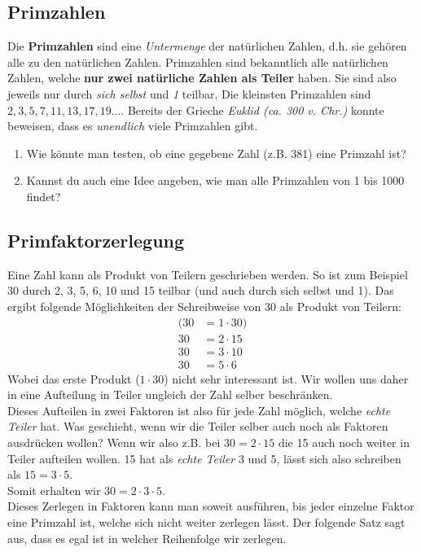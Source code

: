 \subsection{Primzahlen}
Die \textbf{Primzahlen} sind eine \textit{Untermenge} der natürlichen Zahlen, d.h. sie gehören alle zu den natürlichen Zahlen.
Primzahlen sind bekanntlich alle natürlichen Zahlen, welche \textbf{nur zwei natürliche Zahlen als Teiler} haben. Sie sind also jeweils nur durch \textit{sich selbst }und \textit{1} teilbar. Die kleinsten Primzahlen sind $2, 3, 5, 7, 11, 13, 17, 19...$. 
 Bereits der Grieche \emph{Euklid (ca. 300 v. Chr.)} konnte beweisen, dass es \emph{unendlich} viele Primzahlen gibt.
\begin{aufgabe}[Primzahltest]
\begin{center}
\begin{enumerate}[label=\alph*)]
\item Wie könnte man testen, ob eine gegebene Zahl (z.B. 381) eine Primzahl ist?
\item Kannst du auch eine Idee angeben, wie man alle Primzahlen von 1 bis 1000 findet?
\end{enumerate}
\end{center}
\end{aufgabe}
\subsection{Primfaktorzerlegung}
Eine Zahl kann als Produkt von Teilern geschrieben werden. 
So ist zum Beispiel 30 durch 2, 3, 5, 6, 10 und 15 teilbar (und auch durch sich selbst und 1). Das ergibt folgende Möglichkeiten der Schreibweise von 30 als Produkt von Teilern:
\begin{align*}
(30&=1\cdot 30)\\
30&=2\cdot 15\\
30&=3\cdot 10\\
30&=5\cdot 6
\end{align*}
Wobei das erste Produkt ($1\cdot 30$) nicht sehr interessant ist. Wir wollen uns daher in eine Aufteilung in Teiler ungleich der Zahl selber beschränken.\\
Dieses Aufteilen in zwei Faktoren ist also für jede Zahl möglich, welche \emph{echte Teiler} hat.
Was geschieht, wenn wir die Teiler selber auch noch als Faktoren ausdrücken wollen?
Wenn wir also z.B. bei $30=2\cdot 15$ die 15 auch noch weiter in Teiler aufteilen wollen. 15 hat als \emph{echte Teiler} 3 und 5, lässt sich also schreiben als $15=3\cdot 5$.\\
Somit erhalten wir $30=2\cdot 3\cdot 5$.\\
Dieses Zerlegen in Faktoren kann man soweit ausführen, bis jeder einzelne Faktor eine Primzahl ist, welche sich nicht weiter zerlegen lässt. Der folgende Satz sagt aus, dass es egal ist in welcher Reihenfolge wir zerlegen.

